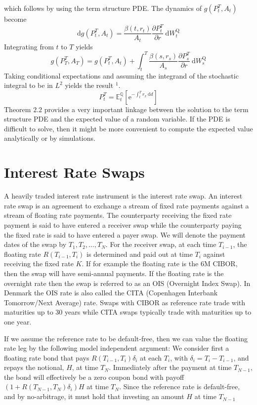 \documentclass[12pt,twoside]{reedthesis}
\begin{document}
which follows by using the term structure PDE. The dynamics of \(g\left(P_{t}^{T}, A_{t}\right)\) become
\[
\mathrm{d} g\left(P_{t}^{T}, A_{t}\right)=\frac{\beta\left(t, r_{t}\right)}{A_{t}} \frac{\partial P_{t}^{T}}{\partial r} \mathrm{~d} W_{t}^{\mathrm{Q}}
\]
Integrating from \(t\) to \(T\) yields
\[
g\left(P_{T}^{T}, A_{T}\right)=g\left(P_{t}^{T}, A_{t}\right)+\int_{t}^{T} \frac{\beta\left(s, r_{s}\right)}{A_{s}} \frac{\partial P_{s}^{T}}{\partial r} \mathrm{~d} W_{s}^{\mathrm{Q}}
\]
Taking conditional expectations and assuming the integrand of the stochastic integral to be in \(L^{2}\) yields the result \(^{1}\).
\[
P_{t}^{T}=\mathbb{E}_{t}^{\mathbb{Q}}\left[\mathrm{e}^{-\int_{t}^{T} r_{x} \mathrm{~d} d}\right]
\]
Theorem \(2.2\) provides a very important linkage between the solution to the term structure PDE and the expected value of a random variable. If the PDE is difficult to solve, then it might be more convenient to compute the expected value analytically or by simulations.

\hypertarget{interest-rate-swaps}{%
\section{Interest Rate Swaps}\label{interest-rate-swaps}}

A heavily traded interest rate instrument is the interest rate swap. An interest rate swap is an agreement to exchange a stream of fixed rate payments against a stream of floating rate payments. The counterparty receiving the fixed rate payment is said to have entered a receiver swap while the counterparty paying the fixed rate is said to have entered a payer swap. We will denote the payment dates of the swap by \(T_{1}, T_{2}, \ldots, T_{N}\). For the receiver swap, at each time \(T_{i-1}\), the floating rate \(R\left(T_{i-1}, T_{i}\right)\) is determined and paid out at time \(T_{i}\) against receiving the fixed rate \(K\). If for example the floating rate is the \(6 \mathrm{M}\) CIBOR, then the swap will have semi-annual payments. If the floating rate is the overnight rate then the swap is referred to as an OIS (Overnight Index Swap). In Denmark the OIS rate is also called the CITA (Copenhagen Interbank Tomorrow/Next Average) rate. Swaps with CIBOR as reference rate trade with maturities up to 30 years while CITA swaps typically trade with maturities up to one year.

If we assume the reference rate to be default-free, then we can value the floating rate leg by the following model independent argument: We consider first a floating rate bond that pays \(R\left(T_{i-1}, T_{i}\right) \delta_{i}\) at each \(T_{i}\), with \(\delta_{i}=T_{i}-T_{i-1}\), and repays the notional, \(H\), at time \(T_{N}\). Immediately after the payment at time \(T_{N-1}\), the bond will effectively be a zero coupon bond with payoff \(\left(1+R\left(T_{N-1}, T_{N}\right) \delta_{i}\right) H\) at time \(T_{N}\). Since the reference rate is default-free, and by no-arbitrage, it must hold that investing an amount \(H\) at time \(T_{N-1}\)
\end{document}
